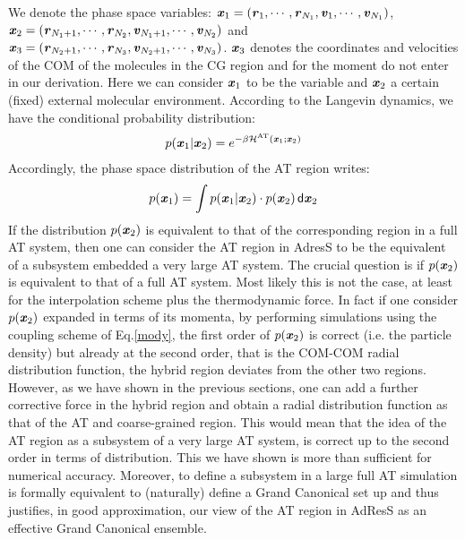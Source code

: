 \documentclass[aps,pre,preprint]{revtex4}
\renewcommand{\v}[1]{\textbf{\textit{#1}}}
\renewcommand{\d}[1]{\textsf{#1}}
\begin{document}
We denote the phase space variables: $\v x_1 = (\v r_1, \cdots, \v
r_{N_1}, \v v_1, \cdots, \v v_{N_1})$,  $\v x_2 = (\v r_{N_1+1},
\cdots, \v r_{N_2}, \v v_{N_1+1}, \cdots, \v v_{N_2})$ and
$\v x_3 = (\v r_{N_2+1},
\cdots, \v r_{N_3}, \v v_{N_2+1}, \cdots, \v v_{N_3})$. $\v x_{3}$ denotes the coordinates and velocities of the COM of the molecules in the CG region and for the moment do not enter in our derivation.
Here we can consider $\v x_1$ to be the variable and $\v x_2$ a certain (fixed) external molecular environment. 
According to the Langevin dynamics, we have the conditional probability distribution:
\begin{align}
  p (\v x_1 \vert \v x_2)  =
  e^{-\beta \mathcal H^{\textrm{AT}}(\v x_1; \v x_2)}
\end{align}
Accordingly, the phase space distribution of the AT region writes:
\begin{align}
  p(\v x_1) = \int p(\v x_1\vert\v x_2)\cdot p (\v x_2) \,\d d\v x_2
\end{align}
If the distribution $p(\v x_2)$ is equivalent to that of the corresponding region in a full AT system, then one can consider the AT region in AdresS to be the equivalent of a subsystem embedded  a very large AT
system.
The crucial question is if $p(\v x_2)$ is equivalent to that of a full AT system. 
Most likely this is not the case, at least for the interpolation scheme plus the thermodynamic force. In fact if one consider $p(\v x_2)$ expanded in terms of its momenta, by performing simulations using the coupling scheme of Eq.\ref{mody}, the first order of $p(\v x_2)$ is correct (i.e. the particle density) but already at the second order, that is the COM-COM radial distribution function, the hybrid region deviates from the other two regions. However, as we have shown in the previous sections, one can add a further corrective force in the hybrid region
and obtain a radial distribution function as that of the AT and coarse-grained region. This would mean that the idea of the AT region as a subsystem of a very large AT system, is correct up to the second order in terms of distribution. This we have shown is more than sufficient for numerical accuracy. Moreover, to define a subsystem in a large full AT simulation is formally equivalent to (naturally) define a Grand Canonical set up and thus justifies, in good approximation, our view of the AT region in AdResS as an effective Grand Canonical ensemble.  
\end{document}
